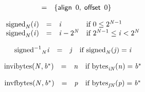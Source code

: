 \vspace{1ex}

\vspace{1ex}

$$
\begin{array}{@{}lcl@{}l@{}}
 &=& \{ \begin{array}[t]{@{}l@{}}
\mathsf{align}~\,0,\; \mathsf{offset}~\,0 \}\end{array} &  \\
\end{array}
$$

\vspace{1ex}

$$
\begin{array}{@{}lcl@{}l@{}}
{{\mathrm{signed}}}_{{\mathit{N}}}({\mathit{i}}) &=& {\mathit{i}} &\quad
  \mbox{if}~0 \leq {2^{{\mathit{N}} - 1}} \\
{{\mathrm{signed}}}_{{\mathit{N}}}({\mathit{i}}) &=& {\mathit{i}} - {2^{{\mathit{N}}}} &\quad
  \mbox{if}~{2^{{\mathit{N}} - 1}} \leq {\mathit{i}} < {2^{{\mathit{N}}}} \\
\end{array}
$$

$$
\begin{array}{@{}lcl@{}l@{}}
{{{{{\mathrm{signed}}^{{-1}}}}{}}_{{\mathit{N}}}}{{{\mathit{i}}}} &=& {\mathit{j}} &\quad
  \mbox{if}~{{\mathrm{signed}}}_{{\mathit{N}}}({\mathit{j}}) = {{\mathit{i}}} \\
\end{array}
$$

\vspace{1ex}

$$
\begin{array}{@{}lcl@{}l@{}}
{\mathrm{invibytes}}({\mathit{N}}, {{\mathit{b}}^\ast}) &=& {\mathit{n}} &\quad
  \mbox{if}~{{\mathrm{bytes}}}_{{{\mathit{i}}}{{\mathit{N}}}}({\mathit{n}}) = {{\mathit{b}}^\ast} \\
\end{array}
$$

$$
\begin{array}{@{}lcl@{}l@{}}
{\mathrm{invfbytes}}({\mathit{N}}, {{\mathit{b}}^\ast}) &=& {\mathit{p}} &\quad
  \mbox{if}~{{\mathrm{bytes}}}_{{{\mathit{f}}}{{\mathit{N}}}}({\mathit{p}}) = {{\mathit{b}}^\ast} \\
\end{array}
$$

\vspace{1ex}

